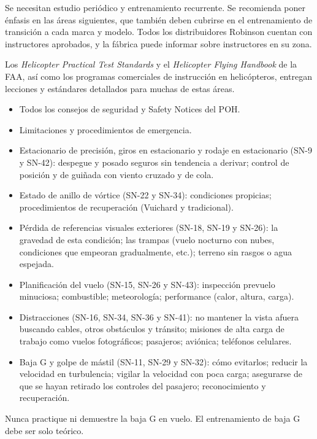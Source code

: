 Se necesitan estudio periódico y entrenamiento recurrente. Se recomienda poner énfasis en las áreas siguientes, que también deben cubrirse en el entrenamiento de transición a cada marca y modelo. Todos los distribuidores Robinson cuentan con instructores aprobados, y la fábrica puede informar sobre instructores en su zona.

\begin{nota}
Los \emph{Helicopter Practical Test Standards} y el \emph{Helicopter Flying Handbook} de la FAA, así como los programas comerciales de instrucción en helicópteros, entregan lecciones y estándares detallados para muchas de estas áreas.
\end{nota}

\begin{itemize}
\item Todos los consejos de seguridad y Safety Notices del POH.
\item Limitaciones y procedimientos de emergencia.
\item Estacionario de precisión, giros en estacionario y rodaje en estacionario (SN-9 y SN-42): despegue y posado seguros sin tendencia a derivar; control de posición y de guiñada con viento cruzado y de cola.
\item Estado de anillo de vórtice (SN-22 y SN-34): condiciones propicias; procedimientos de recuperación (Vuichard y tradicional).
\item Pérdida de referencias visuales exteriores (SN-18, SN-19 y SN-26): la gravedad de esta condición; las trampas (vuelo nocturno con nubes, condiciones que empeoran gradualmente, etc.); terreno sin rasgos o agua espejada.
\item Planificación del vuelo (SN-15, SN-26 y SN-43): inspección prevuelo minuciosa; combustible; meteorología; performance (calor, altura, carga).
\item Distracciones (SN-16, SN-34, SN-36 y SN-41): no mantener la vista afuera buscando cables, otros obstáculos y tránsito; misiones de alta carga de trabajo como vuelos fotográficos; pasajeros; aviónica; teléfonos celulares.
\item Baja G y golpe de mástil (SN-11, SN-29 y SN-32): cómo evitarlos; reducir la velocidad en turbulencia; vigilar la velocidad con poca carga; asegurarse de que se hayan retirado los controles del pasajero; reconocimiento y recuperación.
\end{itemize}

\begin{precaucion}
Nunca practique ni demuestre la baja G en vuelo. El entrenamiento de baja G debe ser solo teórico.
\end{precaucion}

